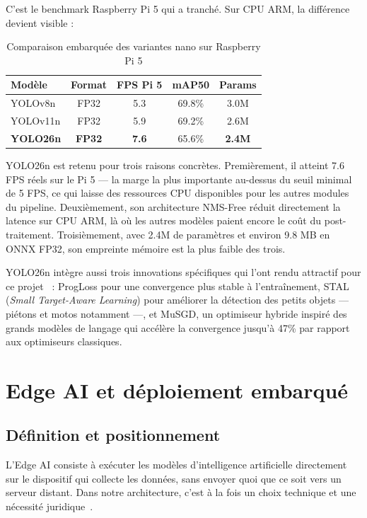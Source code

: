 C'est le benchmark Raspberry Pi 5 qui a
tranché. Sur CPU ARM, la différence devient
visible :

\begin{table}[H]
\centering
\caption{Comparaison embarquée des variantes
         nano sur Raspberry Pi 5}
\begin{tabularx}{\textwidth}{lcccc}
\toprule
\textbf{Modèle} &
\textbf{Format} &
\textbf{FPS Pi 5} &
\textbf{mAP50} &
\textbf{Params} \\
\midrule
YOLOv8n  & FP32 & 5.3 & 69.8\% & 3.0M \\
YOLOv11n & FP32 & 5.9 & 69.2\% & 2.6M \\
\rowcolor{PrimaryBlue!15}
\textbf{YOLO26n} &
\textbf{FP32} & \textbf{7.6} &
65.6\% & \textbf{2.4M} \\
\bottomrule
\end{tabularx}
\label{tab:yolo_benchmark}
\end{table}

YOLO26n est retenu pour trois raisons
concrètes. Premièrement, il atteint 7.6 FPS
réels sur le Pi 5 — la marge la plus
importante au-dessus du seuil minimal de
5 FPS, ce qui laisse des ressources CPU
disponibles pour les autres modules du
pipeline. Deuxièmement, son architecture
NMS-Free réduit directement la latence sur
CPU ARM, là où les autres modèles paient
encore le coût du post-traitement.
Troisièmement, avec 2.4M de paramètres et
environ 9.8 MB en ONNX FP32, son empreinte
mémoire est la plus faible des trois.

YOLO26n intègre aussi trois innovations
spécifiques qui l'ont rendu attractif pour
ce projet~\cite{sapkota2025} : ProgLoss
pour une convergence plus stable à
l'entraînement, STAL (\textit{Small
Target-Aware Learning}) pour améliorer la
détection des petits objets — piétons et
motos notamment —, et MuSGD, un optimiseur
hybride inspiré des grands modèles de
langage qui accélère la convergence jusqu'à
47\% par rapport aux optimiseurs classiques.

\section{Edge AI et déploiement embarqué}

\subsection{Définition et positionnement}

L'Edge AI consiste à exécuter les modèles
d'intelligence artificielle directement
sur le dispositif qui collecte les données,
sans envoyer quoi que ce soit vers un
serveur distant. Dans notre architecture,
c'est à la fois un choix technique et une
nécessité juridique~\cite{ficili2025}.

